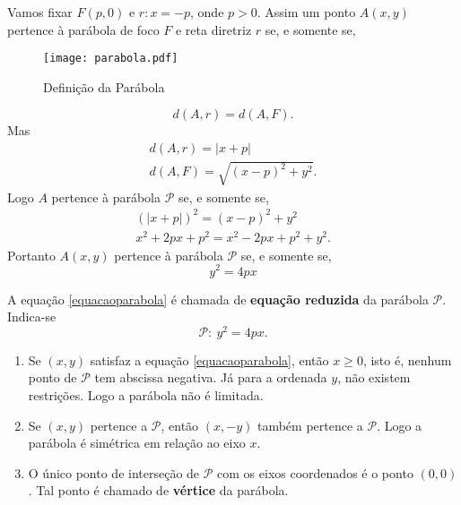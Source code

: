 Vamos fixar $F(p,0)$ e $r: x = -p$, onde $p > 0$. Assim um ponto $A(x,y)$ pertence \`a par\'abola de foco $F$ e reta diretriz $r$ se, e somente se,
\begin{figure}[!h]%
  \centering
  \caption{Defini\c{c}\~ao da Par\'abola}
  \texttt{[image: parabola.pdf]}
\end{figure}

\[
  d(A,r) = d(A,F).
\]
Mas
\begin{align*}
  d(A,r) = |x + p|\\
  d(A,F) = \sqrt{(x - p)^2 + y^2}.
\end{align*}
Logo $A$ pertence \`a par\'abola $\mathcal{P}$ se, e somente se,
\begin{align*}
  (|x + p|)^2 = (x - p)^2 + y^2\\
  x^2 + 2px + p^2 = x^2 - 2px + p^2 + y^2.
\end{align*}
Portanto $A(x,y)$ pertence \`a par\'abola $\mathcal{P}$ se, e somente se,
\begin{equation}\label{equacaoparabola}
  y^2 = 4px
\end{equation}

A equa\c{c}\~ao \eqref{equacaoparabola} \'e chamada de \textbf{equa\c{c}\~ao reduzida} da par\'abola $\mathcal{P}$. Indica-se
\[
  \mathcal{P}:\ y^2 = 4px.
\]

\begin{observacao}
  \begin{enumerate}
    \item Se $(x,y)$ satisfaz a equa\c{c}\~ao \eqref{equacaoparabola}, ent\~ao $x \ge 0$, isto \'e, nenhum ponto de $\mathcal{P}$ tem abscissa negativa. J\'a para a ordenada $y$, n\~ao existem restri\c{c}\~oes. Logo a par\'abola n\~ao \'e limitada.
    \item Se $(x,y)$ pertence a $\mathcal{P}$, ent\~ao $(x,-y)$ tamb\'em pertence a $\mathcal{P}$. Logo a par\'abola \'e sim\'etrica em rela\c{c}\~ao ao eixo $x$.
    \item O \'unico ponto de interse\c{c}\~ao de $\mathcal{P}$ com os eixos coordenados \'e o ponto $(0,0)$. Tal ponto \'e chamado de \textbf{v\'ertice} da par\'abola.
  \end{enumerate}
\end{observacao}

